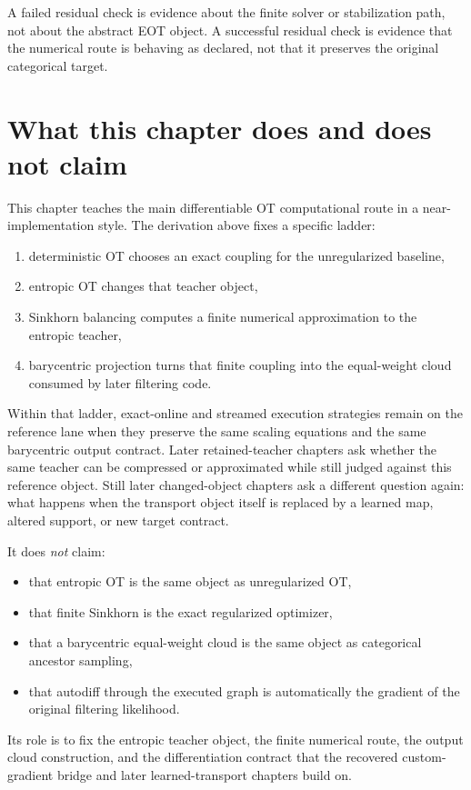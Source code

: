 A failed residual check is evidence about the finite solver or stabilization path,
not about the abstract EOT object.  A successful residual check is evidence that
the numerical route is behaving as declared, not that it preserves the original
categorical target.

\section{What this chapter does and does not claim}
\label{sec:bf-eot-boundary}

This chapter teaches the main differentiable OT computational route in a near-
implementation style.  The derivation above fixes a specific ladder:
\begin{enumerate}[label=(\roman*)]
  \item deterministic OT chooses an exact coupling for the unregularized baseline,
  \item entropic OT changes that teacher object,
  \item Sinkhorn balancing computes a finite numerical approximation to the entropic
    teacher,
  \item barycentric projection turns that finite coupling into the equal-weight
    cloud consumed by later filtering code.
\end{enumerate}
Within that ladder, exact-online and streamed execution strategies remain on the
reference lane when they preserve the same scaling equations and the same
barycentric output contract.  Later retained-teacher chapters ask whether the same
teacher can be compressed or approximated while still judged against this reference
object.  Still later changed-object chapters ask a different question again: what
happens when the transport object itself is replaced by a learned map, altered
support, or new target contract.

It does \emph{not} claim:
\begin{itemize}
  \item that entropic OT is the same object as unregularized OT,
  \item that finite Sinkhorn is the exact regularized optimizer,
  \item that a barycentric equal-weight cloud is the same object as categorical
  ancestor sampling,
  \item that autodiff through the executed graph is automatically the gradient of
    the original filtering likelihood.
\end{itemize}
Its role is to fix the entropic teacher object, the finite numerical route, the
output cloud construction, and the differentiation contract that the recovered
custom-gradient bridge and later learned-transport chapters build on.

\FloatBarrier
